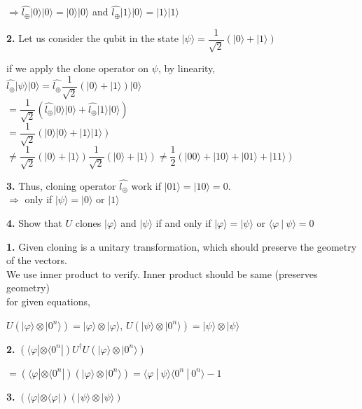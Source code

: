 \documentclass [12pt]{article}
\theoremstyle{definition}
\newcommand{\ket}[1]{| {#1} \rangle}
\newcommand{\bra}[1]{\langle {#1} |}
\newcommand{\braket}[2]{\langle #1 \ | \ #2 \rangle}
\begin{document}
\phantom{1000em} $\Rightarrow \hat{l_{\oplus}}\ket{0}\ket{0} = \ket{0}\ket{0}$ and $\hat{l_{\oplus}}\ket{1}\ket{0} = \ket{1}\ket{1}$ 

\phantom{1em} {\bf 2.} Let us consider the qubit in the state $\ket{\psi} = \dfrac{1}{\sqrt{2}}(\ket{0} + \ket{1})$ 

\phantom{1000em} if we apply the clone operator on $\psi$, by linearity, \\
\phantom{1000em} $\hat{l_{\oplus}}\ket{\psi}\ket{0} = \hat{l_{\oplus}}\dfrac{1}{\sqrt{2}}(\ket{0} + \ket{1})\ket{0}$ \\
\phantom{1000em} $ = \dfrac{1}{\sqrt{2}}(\hat{l_{\oplus}}\ket{0}\ket{0} + \hat{l_{\oplus}}\ket{1}\ket{0})$\\
\phantom{1000em} $ = \dfrac{1}{\sqrt{2}}(\ket{0}\ket{0} +\ket{1}\ket{1})$\\
\phantom{1000em} $ \neq \dfrac{1}{\sqrt{2}}(\ket{0} + \ket{1})\dfrac{1}{\sqrt{2}}(\ket{0} + \ket{1}) \neq \dfrac{1}{2}(\ket{00} + \ket{10} + \ket{01} + \ket{11})$

\phantom{1em} {\bf 3.} Thus, cloning operator $\hat{l_{\oplus}}$ work if $\ket{01} = \ket{10} = 0$. \\
\phantom{1000em} $\Rightarrow$ only if $\ket{\psi} = \ket{0}$ or $\ket{1}$

\newpage

{\bf 4.} Show that $U$ clones $\ket{\varphi}$ and $\ket{\psi}$ if and only if $\ket{\varphi} = \ket{\psi}$ or $\braket{\varphi}{\psi} = 0$ 

\phantom{1em} {\bf 1.} Given cloning is a unitary transformation, which should preserve the geometry of the vectors. \\
\phantom{1000em} We use inner product to verify. Inner product should be same (preserves geometry) \\
\phantom{1000em} for given equations,

\phantom{1000em} $U(\ket{\varphi} \otimes \ket{0^{n}}) = \ket{\varphi} \otimes \ket{\varphi}$, $U(\ket{\psi} \otimes \ket{0^{n}}) = \ket{\psi} \otimes \ket{\psi}$

\phantom{1em} {\bf 2.} $(\bra{\varphi} \otimes \bra{0^{n}})U^{\dagger}U(\ket{\varphi} \otimes \ket{0^{n}})$

\phantom{1000em} $= (\bra{\varphi} \otimes \bra{0^{n}})(\ket{\varphi} \otimes \ket{0^{n}}) = \braket{\varphi}{\psi}\braket{0^{n}}{0^{n}} - 1$

\phantom{1em} {\bf 3.} $(\bra{\varphi} \otimes \bra{\varphi})(\ket{\psi} \otimes \ket{\psi})$
\end{document}
